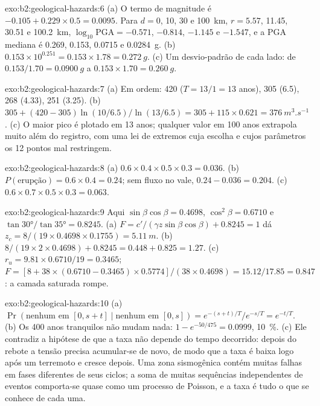 \begin{solution}{exo:b2:geological-hazards:6}
(a) O termo de magnitude é $-0.105 + 0.229 \times 0.5 = 0.0095$. Para $d = 0$, 10, 30 e
\qty{100}{km}, $r = 5.57$, 11.45, 30.51 e \qty{100.2}{km}, $\log_{10}\mathrm{PGA} = -0.571$,
$-0.814$, $-1.145$ e $-1.547$, e a PGA mediana é 0.269, 0.153, 0.0715 e \qty{0.0284}{g}.
(b) $0.153 \times 10^{0.251} = 0.153 \times 1.78 = \qty{0.272}{g}$. (c) Um desvio-padrão
de cada lado: de $0.153/1.70 = \qty{0.0900}{g}$ a $0.153 \times 1.70 = \qty{0.260}{g}$.
\end{solution}

\begin{solution}{exo:b2:geological-hazards:7}
(a) Em ordem: 420 ($T = 13/1 = 13$ anos), 305 (6.5), 268 (4.33), 251 (3.25). (b) $305 + (420 -
305)\ln(10/6.5)/\ln(13/6.5) = 305 + 115 \times 0.621 = \qty{376}{m^3.s^{-1}}$. (c) O maior pico
é plotado em 13 anos; qualquer valor em 100 anos extrapola muito além do registro, com uma lei de
extremos cuja escolha e cujos parâmetros os 12 pontos mal restringem.
\end{solution}

\begin{solution}{exo:b2:geological-hazards:8}
(a) $0.6 \times 0.4 \times 0.5 \times 0.3 = 0.036$. (b) $P(\text{erupção}) = 0.6 \times 0.4 = 0.24$;
sem fluxo no vale, $0.24 - 0.036 = 0.204$. (c) $0.6 \times 0.7 \times 0.5 \times 0.3 =
0.063$.
\end{solution}

\begin{solution}{exo:b2:geological-hazards:9}
Aqui $\sin\beta\cos\beta = 0.4698$, $\cos^2\beta = 0.6710$ e $\tan\ang{30}/\tan\ang{35} =
0.8245$. (a) $F = c'/(\gamma z\sin\beta\cos\beta) + 0.8245 = 1$ dá $z_c = 8/(19 \times 0.4698
\times 0.1755) = \qty{5.11}{m}$. (b) $8/(19 \times 2 \times 0.4698) + 0.8245 = 0.448 + 0.825 =
1.27$. (c) $r_u = 9.81 \times 0.6710/19 = 0.3465$; $F = [8 + 38 \times (0.6710 - 0.3465) \times
0.5774]/(38 \times 0.4698) = 15.12/17.85 = 0.847$: a camada saturada rompe.
\end{solution}

\begin{solution}{exo:b2:geological-hazards:10}
(a) $\Pr(\text{nenhum em } [0, s+t] \mid \text{nenhum em } [0, s]) = e^{-(s+t)/T}/e^{-s/T} = e^{-t/T}$.
(b) Os 400 anos tranquilos não mudam nada: $1 - e^{-50/475} = 0.0999$, \qty{10}{\percent}. (c) Ele
contradiz a hipótese de que a taxa não depende do tempo decorrido: depois do rebote a
tensão precisa acumular-se de novo, de modo que a taxa é baixa logo após um terremoto e cresce depois. Uma zona
sismogênica contém muitas falhas em fases diferentes de seus ciclos; a soma de muitas sequências independentes
de eventos comporta-se quase como um processo de Poisson, e a taxa é tudo o que se conhece de cada uma.
\end{solution}

